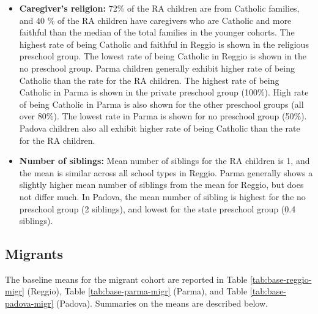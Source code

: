 \documentclass[12pt]{article}
\begin{document}
\begin{itemize}
\item \textbf{Caregiver's religion:} 72\% of the RA children are from Catholic families, and 40 \% of the RA children have caregivers who are Catholic and more faithful than the median of the total families in the younger cohorts. The highest rate of being Catholic and faithful in Reggio is shown in the religious preschool group. The lowest rate of being Catholic in Reggio is shown in the no preschool group. Parma children generally exhibit higher rate of being Catholic than the rate for the RA children. The highest rate of being Catholic in Parma is shown in the private preschool group (100\%). High rate of being Catholic in Parma is also shown for the other preschool groups (all over 80\%). The lowest rate in Parma is shown for no preschool group (50\%). Padova children also all exhibit higher rate of being Catholic than the rate for the RA children. 

\item \textbf{Number of siblings:} Mean number of siblings for the RA children is 1, and the mean is similar across all school types in Reggio. Parma generally shows a slightly higher mean number of siblings from the mean for Reggio, but does not differ much. In Padova, the mean number of sibling is highest for the no preschool group (2 siblings), and lowest for the state preschool group (0.4 siblings).
\end{itemize}

\subsection{Migrants}

The baseline means for the migrant cohort are reported in Table \ref{tab:base-reggio-migr} (Reggio), Table \ref{tab:base-parma-migr} (Parma), and Table \ref{tab:base-padova-migr} (Padova). Summaries on the means are described below.
\end{document}
